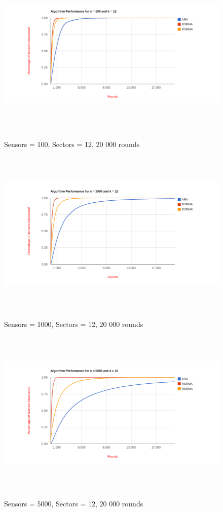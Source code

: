 \begin{figure}[ht]
\caption{Sensors = 100, Sectors = 12, 20 000 rounds}
\includegraphics[height = 8cm]{pics/graph100k12b.png}\\[0.5cm]    
\label{fig:n100k12b}
\end{figure}

\begin{figure}[ht]
\caption{Sensors = 1000, Sectors = 12, 20 000 rounds}
\includegraphics[height = 8cm]{pics/graph1000k12b.png}\\[0.5cm]   
\label{fig:n1000k12b} 
\end{figure}

\begin{figure}[ht]
\caption{Sensors = 5000, Sectors = 12, 20 000 rounds}
\includegraphics[height = 8cm]{pics/graph5000k12b.png}\\[0.5cm] 
\label{fig:n5000k12b}   
\end{figure}